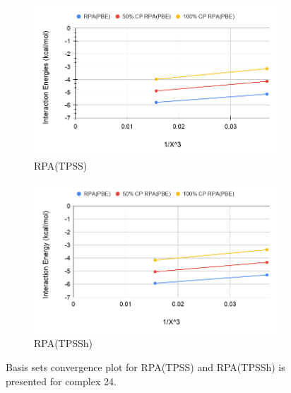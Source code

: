 \documentclass[11pt]{article}
\begin{document}
\begin{figure}[hbpt]
  \centering
  \begin{subfigure}{.5\textwidth}
    \center
    \includegraphics[scale=0.3]{tpss_24.png}
    \caption{RPA(TPSS)}
    \label{fig:tpss_24}
  \end{subfigure}%
  \begin{subfigure}{.5\textwidth}
    \center
    \includegraphics[scale=0.3]{tpssh_24.png}
    \caption{RPA(TPSSh)}
    \label{fig:tpssh_24}
  \end{subfigure}
  \caption{Basis sets convergence plot for RPA(TPSS) and RPA(TPSSh) is
    presented for complex 24.}
  \label{fig:complex_24}
\end{figure}
\end{document}
